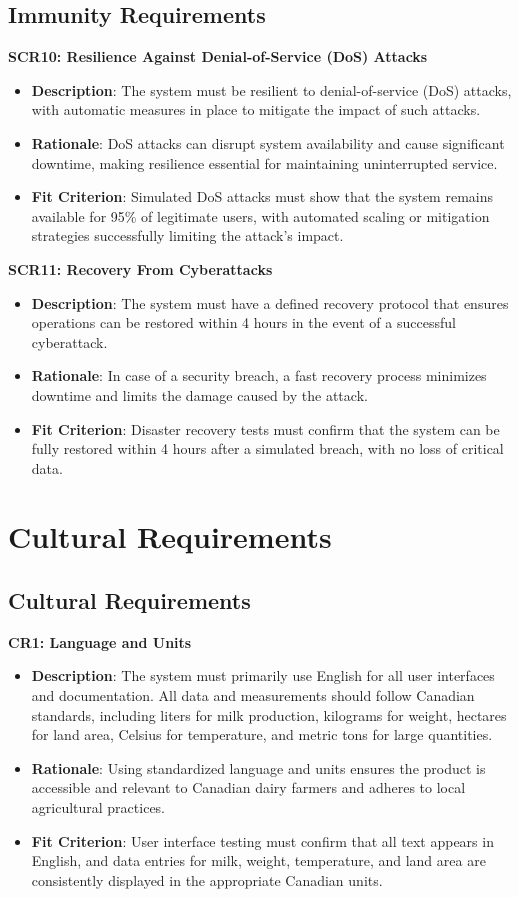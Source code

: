 \documentclass[12pt]{article}
\begin{document}
\subsection{Immunity Requirements}
\textbf{SCR10: Resilience Against Denial-of-Service (DoS) Attacks}
\begin{itemize}
    \item \textbf{Description}: The system must be resilient to 
    denial-of-service (DoS) attacks, with automatic measures in place to 
    mitigate the impact of such attacks.
    \item \textbf{Rationale}: DoS attacks can disrupt system availability and
    cause significant downtime, making resilience essential for maintaining
    uninterrupted service.
    \item \textbf{Fit Criterion}: Simulated DoS attacks must show that the
    system remains available for 95\% of legitimate users, with automated
    scaling or mitigation strategies successfully limiting the attack's impact.
\end{itemize}
\textbf{SCR11: Recovery From Cyberattacks}
\begin{itemize}
    \item \textbf{Description}: The system must have a defined recovery protocol
    that ensures operations can be restored within 4 hours in the event of a
    successful cyberattack.
    \item \textbf{Rationale}: In case of a security breach, a fast recovery
    process minimizes downtime and limits the damage caused by the attack.
    \item \textbf{Fit Criterion}: Disaster recovery tests must confirm that the
    system can be fully restored within 4 hours after a simulated breach, with
    no loss of critical data.
\end{itemize}


\section{Cultural Requirements}
\subsection{Cultural Requirements}
\textbf{CR1: Language and Units}
\begin{itemize}
    \item \textbf{Description}: The system must primarily use English for all
    user interfaces and documentation. All data and measurements should follow
    Canadian standards, including liters for milk production, kilograms for
    weight, hectares for land area, Celsius for temperature, and metric tons for
    large quantities.
    \item \textbf{Rationale}: Using standardized language and units ensures the
    product is accessible and relevant to Canadian dairy farmers and adheres to
    local agricultural practices.
    \item \textbf{Fit Criterion}: User interface testing must confirm that all
    text appears in English, and data entries for milk, weight, temperature, and
    land area are consistently displayed in the appropriate Canadian units.
\end{itemize}
\end{document}
